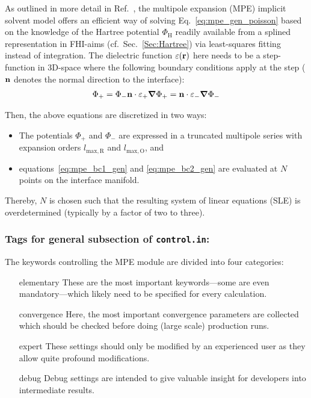 As outlined in more detail in Ref.~\cite{Sinstein2017_MPE}, the multipole expansion (MPE) implicit solvent model offers an efficient way of solving Eq.~\ref{eq:mpe_gen_poisson} based on the knowledge of the Hartree potential $\Phi_\mathrm{H}$ readily available from a splined representation in FHI-aims (cf.~Sec.~\ref{Sec:Hartree}) via least-squares fitting instead of integration. 
The dielectric function $\varepsilon({\boldsymbol{\mathbf{r}}})$ here needs to be a step-function in 3D-space where the following boundary conditions apply at the step (${\boldsymbol{\mathbf{n}}}$ denotes the normal direction to the interface): 
\begin{subequations}
\begin{align}
\Phi_+ = \Phi_- \label{eq:mpe_bc1_gen}
\end{align}
\begin{align}
\Vect{n} \cdot \varepsilon_+ \Del \Phi_+ = \Vect{n} \cdot \varepsilon_- \Del \Phi_- \label{eq:mpe_bc2_gen}
\end{align}
\end{subequations}

Then, the above equations are discretized in two ways: 
\begin{itemize}
\item The potentials $\Phi_+$ and $\Phi_-$ are expressed in a truncated multipole series with expansion orders $l_\mathrm{max,R}$ and $l_\mathrm{max,O}$, and
\item equations~\ref{eq:mpe_bc1_gen} and \ref{eq:mpe_bc2_gen} are evaluated at $N$ points on the interface manifold. 
\end{itemize}
Thereby, $N$ is chosen such that the resulting system of linear equations (SLE) is overdetermined (typically by a factor of two to three). 




\subsubsection*{Tags for general subsection of \texttt{control.in}:}

The keywords controlling the MPE module are divided into four categories:
\begin{itemize}
\item[elementary] These are the most important keywords---some are even mandatory---which likely need to be specified for every calculation. 
\item[convergence] Here, the most important convergence parameters are collected which should be checked before doing (large scale) production runs. 
\item[expert] These settings should only be modified by an experienced user as they allow quite profound modifications. 
\item[debug] Debug settings are intended to give valuable insight for developers into intermediate results. 
\end{itemize}

